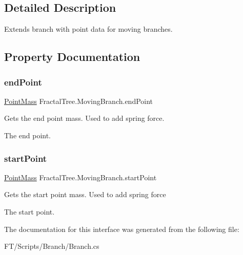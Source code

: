 \subsection{Detailed Description}
Extends branch with point data for moving branches. 



\subsection{Property Documentation}
\mbox{\label{interface_fractal_tree_1_1_moving_branch_a232ab0d1d87bb5a0abc5c54d4f26fe2b}} 
\subsubsection{\texorpdfstring{end\+Point}{endPoint}}
{\footnotesize\ttfamily \hyperlink{class_fractal_tree_1_1_point_mass}{Point\+Mass} Fractal\+Tree.\+Moving\+Branch.\+end\+Point\hspace{0.3cm}{\ttfamily [get]}}



Gets the end point mass. Used to add spring force. 

The end point.\mbox{\label{interface_fractal_tree_1_1_moving_branch_afbf74eadb94a987e4f845e77b8d0b964}} 
\subsubsection{\texorpdfstring{start\+Point}{startPoint}}
{\footnotesize\ttfamily \hyperlink{class_fractal_tree_1_1_point_mass}{Point\+Mass} Fractal\+Tree.\+Moving\+Branch.\+start\+Point\hspace{0.3cm}{\ttfamily [get]}}



Gets the start point mass. Used to add spring force 

The start point.

The documentation for this interface was generated from the following file\+:\begin{DoxyCompactItemize}
\item 
F\+T/\+Scripts/\+Branch/Branch.\+cs\end{DoxyCompactItemize}
